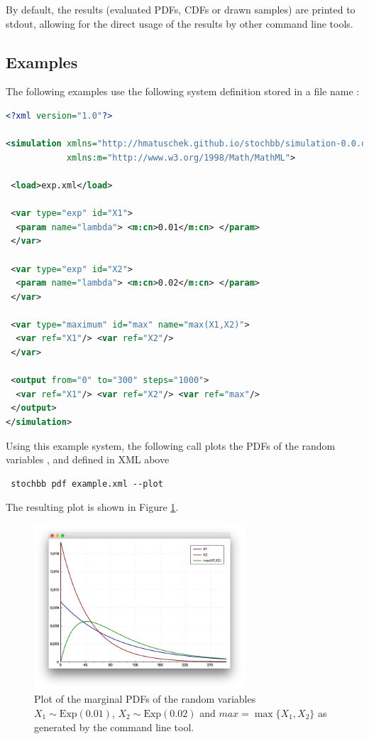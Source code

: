 By default, the results (evaluated PDFs, CDFs or drawn samples) are printed to stdout, allowing for the direct usage 
of the results by other command line tools.

\subsection{Examples}
The following examples use the following system definition stored in a file name :
\begin{lstlisting}[language=XML]
<?xml version="1.0"?>

<simulation xmlns="http://hmatuschek.github.io/stochbb/simulation-0.0.dtd"
            xmlns:m="http://www.w3.org/1998/Math/MathML">

 <load>exp.xml</load>

 <var type="exp" id="X1">
  <param name="lambda"> <m:cn>0.01</m:cn> </param>
 </var>

 <var type="exp" id="X2">
  <param name="lambda"> <m:cn>0.02</m:cn> </param>
 </var>

 <var type="maximum" id="max" name="max(X1,X2)">
  <var ref="X1"/> <var ref="X2"/>
 </var>

 <output from="0" to="300" steps="1000">
  <var ref="X1"/> <var ref="X2"/> <var ref="max"/>
 </output>
</simulation>
\end{lstlisting}

Using this example system, the following call plots the PDFs of the random variables ,  and  defined in XML above
\begin{lstlisting}
 stochbb pdf example.xml --plot
\end{lstlisting}
The resulting plot is shown in Figure \ref{fig:exampleplot1}.	

\begin{figure}
 \centering
  \includegraphics[width=0.7\textwidth]{exampleplot1.png}
  \caption{Plot of the marginal PDFs of the random variables $X_1\sim \text{Exp}(0.01)$, $X_2\sim \text{Exp}(0.02)$ and 
	$max = \max\{X_1,X_2\}$ as generated by the  command line tool.} \label{fig:exampleplot1}
\end{figure}

